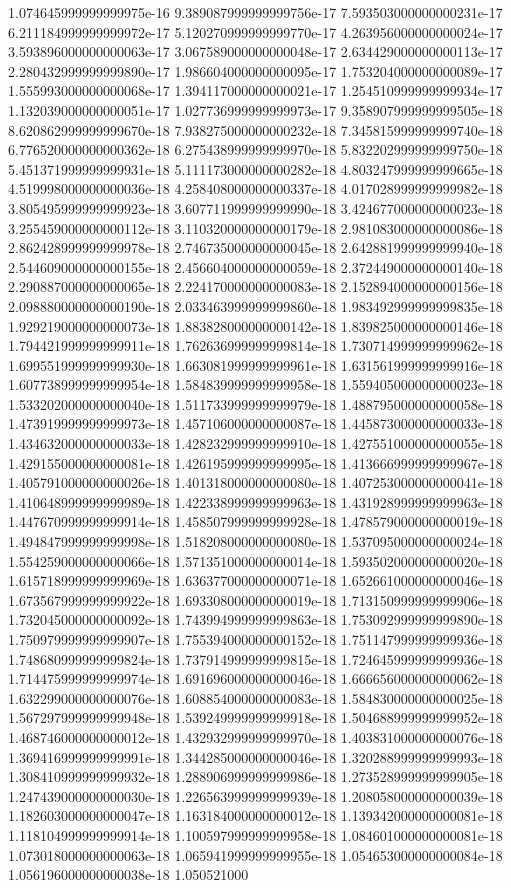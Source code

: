 1.074645999999999975e-16	9.389087999999999756e-17	7.593503000000000231e-17	6.211184999999999972e-17	5.120270999999999770e-17	4.263956000000000024e-17	3.593896000000000063e-17	3.067589000000000048e-17	2.634429000000000113e-17	2.280432999999999890e-17	1.986604000000000095e-17	1.753204000000000089e-17	1.555993000000000068e-17	1.394117000000000021e-17	1.254510999999999934e-17	1.132039000000000051e-17	1.027736999999999973e-17	9.358907999999999505e-18	8.620862999999999670e-18	7.938275000000000232e-18	7.345815999999999740e-18	6.776520000000000362e-18	6.275438999999999970e-18	5.832202999999999750e-18	5.451371999999999931e-18	5.111173000000000282e-18	4.803247999999999665e-18	4.519998000000000036e-18	4.258408000000000337e-18	4.017028999999999982e-18	3.805495999999999923e-18	3.607711999999999990e-18	3.424677000000000023e-18	3.255459000000000112e-18	3.110320000000000179e-18	2.981083000000000086e-18	2.862428999999999978e-18	2.746735000000000045e-18	2.642881999999999940e-18	2.544609000000000155e-18	2.456604000000000059e-18	2.372449000000000140e-18	2.290887000000000065e-18	2.224170000000000083e-18	2.152894000000000156e-18	2.098880000000000190e-18	2.033463999999999860e-18	1.983492999999999835e-18	1.929219000000000073e-18	1.883828000000000142e-18	1.839825000000000146e-18	1.794421999999999911e-18	1.762636999999999814e-18	1.730714999999999962e-18	1.699551999999999930e-18	1.663081999999999961e-18	1.631561999999999916e-18	1.607738999999999954e-18	1.584839999999999958e-18	1.559405000000000023e-18	1.533202000000000040e-18	1.511733999999999979e-18	1.488795000000000058e-18	1.473919999999999973e-18	1.457106000000000087e-18	1.445873000000000033e-18	1.434632000000000033e-18	1.428232999999999910e-18	1.427551000000000055e-18	1.429155000000000081e-18	1.426195999999999995e-18	1.413666999999999967e-18	1.405791000000000026e-18	1.401318000000000080e-18	1.407253000000000041e-18	1.410648999999999989e-18	1.422338999999999963e-18	1.431928999999999963e-18	1.447670999999999914e-18	1.458507999999999928e-18	1.478579000000000019e-18	1.494847999999999998e-18	1.518208000000000080e-18	1.537095000000000024e-18	1.554259000000000066e-18	1.571351000000000014e-18	1.593502000000000020e-18	1.615718999999999969e-18	1.636377000000000071e-18	1.652661000000000046e-18	1.673567999999999922e-18	1.693308000000000019e-18	1.713150999999999906e-18	1.732045000000000092e-18	1.743994999999999863e-18	1.753092999999999890e-18	1.750979999999999907e-18	1.755394000000000152e-18	1.751147999999999936e-18	1.748680999999999824e-18	1.737914999999999815e-18	1.724645999999999936e-18	1.714475999999999974e-18	1.691696000000000046e-18	1.666656000000000062e-18	1.632299000000000076e-18	1.608854000000000083e-18	1.584830000000000025e-18	1.567297999999999948e-18	1.539249999999999918e-18	1.504688999999999952e-18	1.468746000000000012e-18	1.432932999999999970e-18	1.403831000000000076e-18	1.369416999999999991e-18	1.344285000000000046e-18	1.320288999999999993e-18	1.308410999999999932e-18	1.288906999999999986e-18	1.273528999999999905e-18	1.247439000000000030e-18	1.226563999999999939e-18	1.208058000000000039e-18	1.182603000000000047e-18	1.163184000000000012e-18	1.139342000000000081e-18	1.118104999999999914e-18	1.100597999999999958e-18	1.084601000000000081e-18	1.073018000000000063e-18	1.065941999999999955e-18	1.054653000000000084e-18	1.056196000000000038e-18	1.050521000